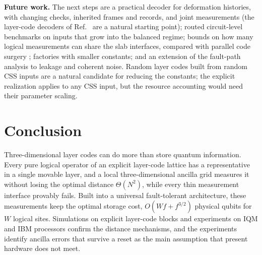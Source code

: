 \documentclass[10pt,a4paper,twocolumn]{article}
\begin{document}
\textbf{Future work.}  The next steps are a practical decoder for deformation
histories, with changing checks, inherited frames and records, and joint
measurements (the layer-code decoders of Ref.~\cite{GuRandomLayerCodes2026} are a
natural starting point); routed circuit-level benchmarks on inputs that grow into
the balanced regime; bounds on how many logical measurements can share the slab
interfaces, compared with parallel code surgery \cite{CowtanParallelSurgery};
factories with smaller constants; and an extension of the fault-path analysis to
leakage and coherent noise.  Random layer codes built from random CSS inputs
\cite{GuRandomLayerCodes2026} are a natural candidate for reducing the
constants; the explicit realization applies to any CSS input, but the resource
accounting would need their parameter scaling.

\section{Conclusion}
\label{sec:conclusion}
Three-dimensional layer codes can do more than store quantum information.  Every
pure logical operator of an explicit layer-code lattice has a representative in
a single movable layer, and a local three-dimensional ancilla grid measures it
without losing the optimal distance $\Theta(N^2)$, while every thin measurement
interface provably fails.  Built into a universal fault-tolerant architecture,
these measurements keep the optimal storage cost, $O(Wf+f^{3/2})$ physical qubits
for $W$ logical sites.  Simulations on explicit layer-code blocks and experiments
on IQM and IBM processors confirm the distance mechanisms, and the experiments
identify ancilla errors that survive a reset as the main assumption that present
hardware does not meet.

\end{document}
